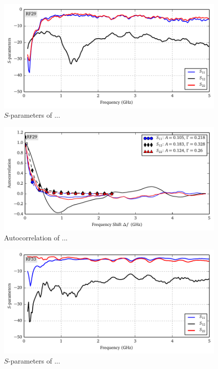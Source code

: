 \begin{figure}
 \centering
 \includegraphics{figs/active/RF29-sParameters.pdf}
 \caption{$S$-parameters of ...}
\end{figure}

\begin{figure}
 \centering
 \includegraphics{figs/active/RF29-autoCorrelation.pdf}
 \caption{Autocorrelation of ...}
\end{figure}

\begin{figure}
 \centering
 \includegraphics{figs/active/RF33-sParameters.pdf}
 \caption{$S$-parameters of ...}
\end{figure}

